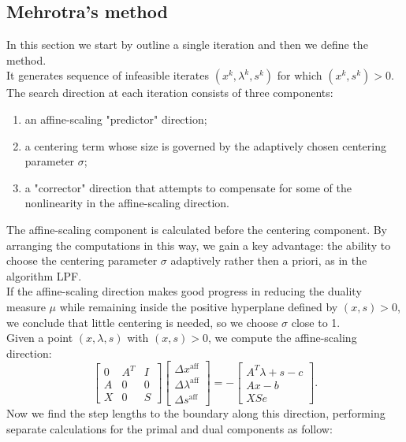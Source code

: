 \documentclass[a4paper,10 pt,titlepage,twoside]{book}
\theoremstyle{plain}
\theoremstyle{definition}
\theoremstyle{remark}
\begin{document}
\subsection{Mehrotra's method}
In this section we start by outline a single iteration and then we define the method.\\
It generates sequence of infeasible iterates $(x^{k},\lambda^{k},s^{k})$ for which $(x^{k},s^{k})>0$. The search direction at each iteration consists of three components:
\begin{enumerate}
	\item an affine-scaling "predictor" direction;
	\item a centering term whose size is governed by the adaptively chosen centering parameter $\sigma$;
	\item a "corrector" direction that attempts to compensate for some of the nonlinearity in the affine-scaling direction.
	\end{enumerate}
The affine-scaling component is calculated before the centering component. By arranging the computations in this way, we gain a key advantage: the ability to choose the centering parameter $\sigma$ adaptively rather then a priori, as in the algorithm LPF.\\
If the affine-scaling direction makes good progress in reducing the duality measure $\mu$ while remaining inside the positive hyperplane defined by $(x,s)>0$, we conclude that little centering is needed, so we choose $\sigma$ close to 1.\\
Given a point $(x, \lambda, s)$ with $(x, s)> 0$, we compute the affine-scaling direction:
\begin{equation}\label{(A)}\tag{4.21}
\begin{bmatrix}
0&A^{T}&I \\A&0&0\\X&0&S
\end{bmatrix}\begin{bmatrix}
\Delta x^{\text{aff}}\\\Delta\lambda^{\text{aff}}\\\Delta s^{\text{aff}}
\end{bmatrix}=-\begin{bmatrix}
A^{T}\lambda+s-c\\Ax-b\\XSe
\end{bmatrix}.
\end{equation}
Now we find the step lengths to the boundary along this direction, performing separate calculations for the primal and dual components as follow:
\end{document}

